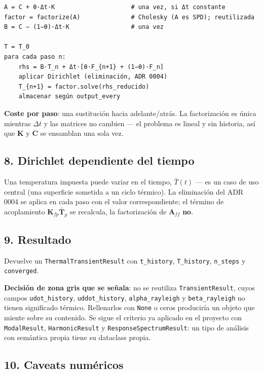 \documentclass[11pt,letterpaper,oneside]{report}
\begin{document}
\begin{lstlisting}
A = C + θ·Δt·K                     # una vez, si Δt constante
factor = factorize(A)              # Cholesky (A es SPD); reutilizada
B = C − (1−θ)·Δt·K                 # una vez

T = T_0
para cada paso n:
    rhs = B·T_n + Δt·[θ·F_{n+1} + (1−θ)·F_n]
    aplicar Dirichlet (eliminación, ADR 0004)
    T_{n+1} = factor.solve(rhs_reducido)
    almacenar según output_every

\end{lstlisting}

\textbf{Coste por paso}: una sustitución hacia adelante/atrás. La factorización es única mientras $\Delta t$ y las matrices no cambien --- el problema es lineal y sin historia, así que $\mathbf K$ y $\mathbf C$ se ensamblan una sola vez.

\subsection{8. Dirichlet dependiente del tiempo}

Una temperatura impuesta puede variar en el tiempo, $\bar T(t)$ --- es un caso de uso central (una superficie sometida a un ciclo térmico). La eliminación del ADR 0004 se aplica en cada paso con el valor correspondiente; el término de acoplamiento $\mathbf K_{fp}\bar{\mathbf T}_p$ se recalcula, la factorización de $\mathbf A_{ff}$ \textbf{no}.

\subsection{9. Resultado}

Devuelve un \texttt{ThermalTransientResult} con \texttt{t\_history}, \texttt{T\_history}, \texttt{n\_steps} y \texttt{converged}.

\textbf{Decisión de zona gris que se señala}: no se reutiliza \texttt{TransientResult}, cuyos campos \texttt{udot\_history}, \texttt{uddot\_history}, \texttt{alpha\_rayleigh} y \texttt{beta\_rayleigh} no tienen significado térmico. Rellenarlos con \texttt{None} o ceros produciría un objeto que miente sobre su contenido. Se sigue el criterio ya aplicado en el proyecto con \texttt{ModalResult}, \texttt{HarmonicResult} y \texttt{ResponseSpectrumResult}: un tipo de análisis con semántica propia tiene su dataclass propia.

\subsection{10. Caveats numéricos}
\end{document}
